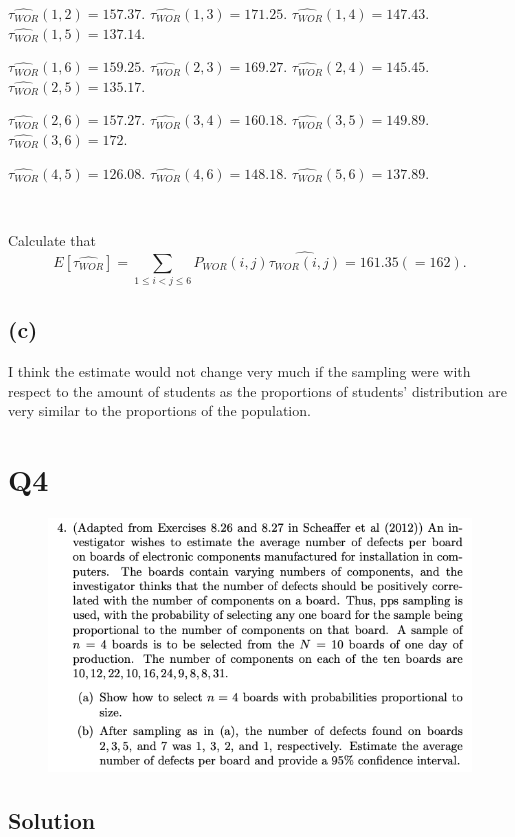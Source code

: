 \documentclass[12pt]{article}%
\begin{document}
$\widehat{\tau_{WOR}}(1,2)=157.37.$ 
$\widehat{\tau_{WOR}}(1,3)=171.25.$
$\widehat{\tau_{WOR}}(1,4)=147.43.$
$\widehat{\tau_{WOR}}(1,5)=137.14.$

$\widehat{\tau_{WOR}}(1,6)=159.25.$
$\widehat{\tau_{WOR}}(2,3)=169.27.$
$\widehat{\tau_{WOR}}(2,4)=145.45.$
$\widehat{\tau_{WOR}}(2,5)=135.17.$

$\widehat{\tau_{WOR}}(2,6)=157.27.$
$\widehat{\tau_{WOR}}(3,4)=160.18.$
$\widehat{\tau_{WOR}}(3,5)=149.89.$
$\widehat{\tau_{WOR}}(3,6)=172.$

$\widehat{\tau_{WOR}}(4,5)=126.08.$
$\widehat{\tau_{WOR}}(4,6)=148.18.$
$\widehat{\tau_{WOR}}(5,6)=137.89.$

~\ 

Calculate that 
$$E[\widehat{\tau_{WOR}}]
=\sum_{1\leq i < j\leq 6}P_{WOR}(i,j)\widehat{\tau_{WOR}(i,j)}
=161.35(=162).$$

\subsection{(c)}
I think the estimate would not change very much 
if the sampling were with respect
to the amount of students as the proportions 
of students' distribution are very similar to 
the proportions of the population.


\newpage
\section{Q4}
\begin{figure}[htp]
    \includegraphics[width = 15cm]{img/Q4.png}
\end{figure}
\subsection*{Solution}
\end{document}
